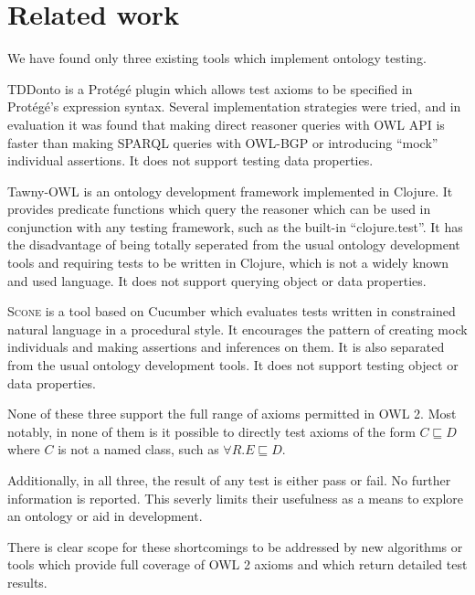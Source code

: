 \documentclass[paper.tex]{subfiles}
\begin{document}
\section{Related work}
\label{sec:related}

We have found only three existing tools which implement ontology testing.

TDDonto \cite{Lawrynowicz:TDDontoTool} is a Prot\'eg\'e plugin which allows test axioms to be specified in Prot\'eg\'e's expression syntax.
Several implementation strategies were tried, and in evaluation it was found that making direct reasoner queries with OWL API is faster than making SPARQL queries with OWL-BGP or introducing ``mock'' individual assertions.
It does not support testing data properties.

Tawny-OWL \cite{Warrender:HowWhatWhyTest} is an ontology development framework implemented in Clojure.
It provides predicate functions which query the reasoner which can be used in conjunction with any testing framework, such as the built-in ``clojure.test''.
It has the disadvantage of being totally seperated from the usual ontology development tools and requiring tests to be written in Clojure, which is not a widely known and used language.
It does not support querying object or data properties.

\textsc{Scone} \cite{Scone:Bitbucket} is a tool based on Cucumber \cite{Cucumber} which evaluates tests written in constrained natural language in a procedural style.
It encourages the pattern of creating mock individuals and making assertions and inferences on them.
It is also separated from the usual ontology development tools.  It does not support testing object or data properties.

None of these three support the full range of axioms permitted in OWL 2.
Most notably, in none of them is it possible to directly test axioms of the form $C \sqsubseteq D$ where $C$ is not a named class, such as $\forall R.E \sqsubseteq D$.

Additionally, in all three, the result of any test is either pass or fail.
No further information is reported.
This severly limits their usefulness as a means to explore an ontology or aid in development.

There is clear scope for these shortcomings to be addressed by new algorithms or tools which provide full coverage of OWL 2 axioms and which return detailed test results.
\end{document}

